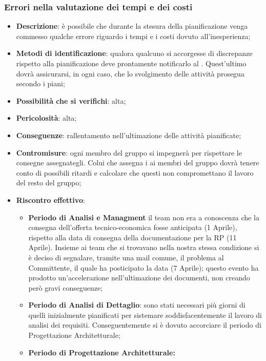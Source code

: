 		\subsubsection{Errori nella valutazione dei tempi e dei costi}
		\begin{itemize}
			\item \textbf{Descrizione}: è possibile che durante la stesura della pianificazione venga commesso qualche errore riguardo i tempi e i costi dovuto all'inesperienza;
			\item \textbf{Metodi di identificazione}: qualora qualcuno si accorgesse di discrepanze rispetto alla pianificazione deve prontamente notificarlo al \RES{}. Quest'ultimo dovrà assicurarsi, in ogni caso, che lo svolgimento delle attività prosegua secondo i piani; 
			\item \textbf{Possibilità che si verifichi}: alta;
			\item \textbf{Pericolosità}: alta;
			\item \textbf{Conseguenze}: rallentamento nell'ultimazione delle attività pianificate;
			\item \textbf{Contromisure}: ogni membro del gruppo si impegnerà per rispettare le consegne assegnategli. Colui che assegna i  ai membri del gruppo dovrà tenere conto di possibili ritardi e calcolare che questi non compromettano il lavoro del resto del gruppo; 
			\item \textbf{Riscontro effettivo}:
			\begin{itemize}
				 \item \textbf{Periodo di Analisi e Managment} il team non era a conoscenza che la consegna dell'offerta tecnico-economica fosse anticipata (1 Aprile), rispetto alla data di consegna della documentazione per la RP (11 Aprile). Insieme ai team che si trovavano nella nostra stessa condizione si è deciso di segnalare, tramite una mail comune, il problema al Committente, il quale ha posticipato la data (7 Aprile); questo evento ha prodotto un'accelerazione nell'ultimazione dei documenti, non creando però gravi conseguenze;
				 \item \textbf{Periodo di Analisi di Dettaglio}: sono stati necessari più giorni di quelli inizialmente pianificati per sistemare soddisfacentemente il lavoro di analisi dei requisiti. Conseguentemente si è dovuto accorciare il periodo di Progettazione Architetturale;
				 \item \textbf{Periodo di Progettazione Architetturale:}  %
			\end{itemize}
		\end{itemize}
		
